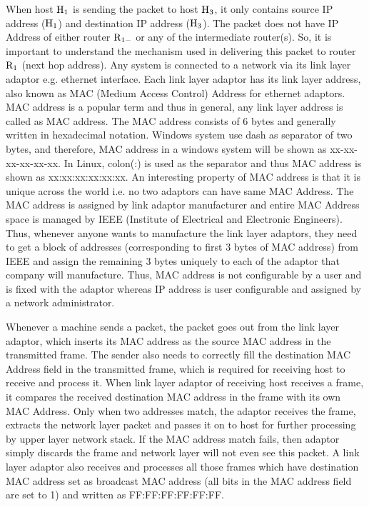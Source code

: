 \begin{multicols}{2}
When host ${\rm H}_{1}$ is sending the packet to host ${\rm H}_{3}$, it only contains source IP address (${\rm H}_{1}$) and destination IP address (${\rm H}_{3}$). The packet does not have IP Address of either router ${\rm R}_{1-}$ or any of the intermediate router(s). So, it is important to understand the mechanism used in delivering this packet to router ${\rm R}_{1}$ (next hop address). Any system is connected to a network via its link layer adaptor e.g. ethernet interface. Each link layer adaptor has its link layer address, also known as MAC (Medium Access Control) Address for ethernet adaptors. MAC address is a popular term and thus in general, any link layer address is called as MAC address. The MAC address consists of 6 bytes and generally written in hexadecimal notation. Windows system use dash as separator of two bytes, and therefore, MAC address in a windows system will be shown as xx-xx-xx-xx-xx-xx. In Linux, colon(:) is used as the separator and thus MAC address is shown as xx:xx:xx:xx:xx:xx.  An interesting property of MAC address is that it is unique across the world i.e. no two adaptors can have same MAC Address. The MAC address is assigned by link adaptor manufacturer and entire MAC Address space is managed by IEEE (Institute of Electrical and Electronic Engineers). Thus, whenever anyone wants to manufacture the link layer adaptors, they need to get a block of addresses (corresponding to first 3 bytes of MAC address) from IEEE and assign the remaining 3 bytes uniquely to each of the adaptor that company will manufacture. Thus, MAC address is not configurable by a user and is fixed with the adaptor whereas IP address is user configurable and assigned by a network administrator.

Whenever a machine sends a packet, the packet goes out from the link layer adaptor, which inserts its MAC address as the source MAC address in the transmitted frame. The sender also needs to correctly fill the destination MAC Address field in the transmitted frame, which is required for receiving host to receive and process it.  When link layer adaptor of receiving host receives a frame, it compares the received destination MAC address in the frame with its own MAC Address. Only when two addresses match, the adaptor receives the frame, extracts the network layer packet and passes it on to host for further processing by upper layer network stack. If the MAC address match fails, then adaptor simply discards the frame and network layer will not even see this packet. A link layer adaptor also receives and processes all those frames which have destination MAC address set as broadcast MAC address (all bits in the MAC address field are set to 1) and written as FF:FF:FF:FF:FF:FF.


\end{multicols}
